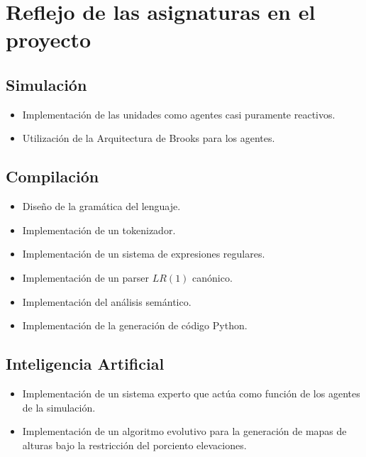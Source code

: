 \section{Reflejo de las asignaturas en el proyecto}

\subsection{Simulación}

\begin{itemize}
    \item Implementación de las unidades como agentes casi puramente reactivos.
    \item Utilización de la Arquitectura de Brooks para los agentes.
\end{itemize}

\subsection{Compilación}

\begin{itemize}
    \item Diseño de la gramática del lenguaje.
    \item Implementación de un tokenizador.
    \item Implementación de un sistema de expresiones regulares.
    \item Implementación de un parser $LR(1)$ canónico.
    \item Implementación del análisis semántico.
    \item Implementación de la generación de código Python.
\end{itemize}

\subsection{Inteligencia Artificial}

\begin{itemize}
    \item Implementación de un sistema experto que actúa como función de los agentes de la simulación.
    \item Implementación de un algoritmo evolutivo para la generación de mapas de alturas bajo la restricción del porciento elevaciones.
\end{itemize}